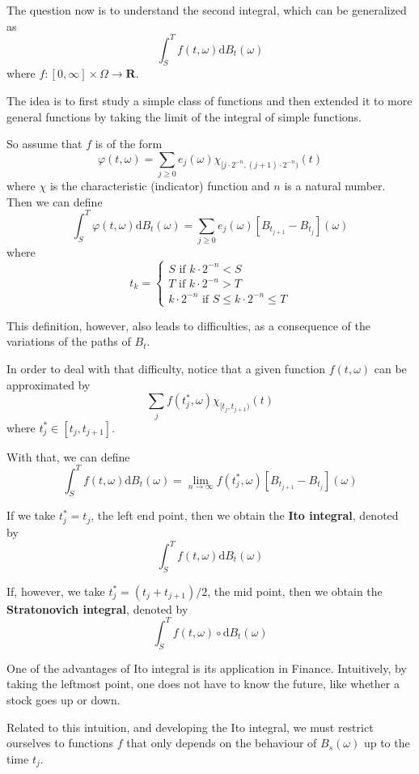 \documentclass[12pt,a4paper]{article}
\theoremstyle{definition}
\begin{document}
The question now is to understand the second integral, which can be generalized as
\[
	\int_S^T f(t, \omega) \mathrm{d}B_t(\omega)
\]
where $f : [0, \infty] \times \Omega \longrightarrow \textbf{R}$.

The idea is to first study a simple class of functions and then extended it to more general functions by taking the limit of the integral of simple functions.

So assume that $f$ is of the form
\[
	\varphi(t, \omega) = \sum_{j \geq 0} e_j(\omega) \chi_{[j \cdot 2^{-n},(j+1) \cdot 2^{-n})}(t)
\]
where $\chi$ is the characteristic (indicator) function and $n$ is a natural number. Then we can define
\[
	\int_S^T \varphi(t, \omega) \mathrm{d}B_t(\omega) = \sum_{j \geq 0} e_j(\omega) [B_{t_{j+1}} - B_{t_j}](\omega)
\]
where
\begin{equation*}
	t_k = 
    \begin{cases}
      S \text{ if } k \cdot 2^{-n} < S \\
      T \text{ if } k \cdot 2^{-n} > T \\
      k\cdot 2^{-n} \text{ if } S \leq k \cdot 2^{-n} \leq T
    \end{cases}
\end{equation*}

This definition, however, also leads to difficulties, as a consequence of the variations of the paths of $B_t$. 

In order to deal with that difficulty, notice that a given function $f(t, \omega)$ can be approximated by
\[
	\sum_j f(t_j^\ast,\omega) \chi_{[t_j, t_{j+1})}(t)
\]
where $t_j^\ast \in [t_j, t_{j+1}]$.

With that, we can define
\[
	\int_S^T f(t, \omega) \mathrm{d}B_t(\omega) = \lim_{n \to \infty} f(t_j^\ast,\omega) [B_{t_{j+1}} - B_{t_j}](\omega)
\]

If we take $t_j^\ast = t_j$, the left end point, then we obtain the \textbf{Ito integral}, denoted by
\[
	\int_S^T f(t, \omega) \mathrm{d}B_t(\omega)
\]

If, however, we take $t_j^\ast = (t_j + t_{j+1})/2$, the mid point, then we obtain the \textbf{Stratonovich integral}, denoted by
\[
	\int_S^T f(t, \omega) \circ \mathrm{d}B_t(\omega)
\]

One of the advantages of Ito integral is its application in Finance. Intuitively, by taking the leftmost point, one does not have to know the future, like whether a stock goes up or down.

Related to this intuition, and developing the Ito integral, we must restrict ourselves to functions $f$ that only depends on the behaviour of $B_s(\omega)$ up to the time $t_j$. 
\end{document}
